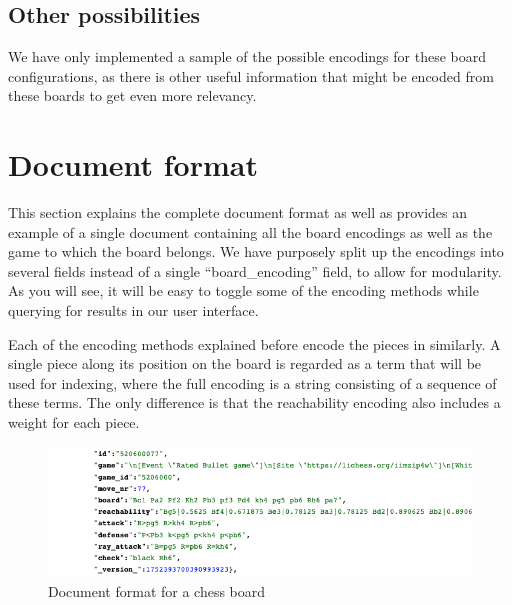 \documentclass[11pt]{article}
\begin{document}
    \subsection{Other possibilities}

    We have only implemented a sample of the possible encodings for these board configurations, as there is other useful information that might be encoded from these boards to get even more relevancy.



    \section{Document format}\label{sec:documentformat}


    This section explains the complete document format as well as provides an example of a single document containing all the board encodings as well as the game to which the board belongs. We have purposely split up the encodings into several fields instead of a single ``board\_encoding'' field, to allow for modularity. As you will see, it will be easy to toggle some of the encoding methods while querying for results in our user interface.

    Each of the encoding methods explained before encode the pieces in similarly. A single piece along its position on the board is regarded as a term that will be used for indexing, where the full encoding is a string consisting of a sequence of these terms. The only difference is that the reachability encoding also includes a weight for each piece.

    \begin{figure}[H]
        \centering
        \includegraphics[width=16cm]{images/DocumentFormat}
        \caption{Document format for a chess board}
        \label{fig:DocumentFormat}
    \end{figure}
\end{document}
